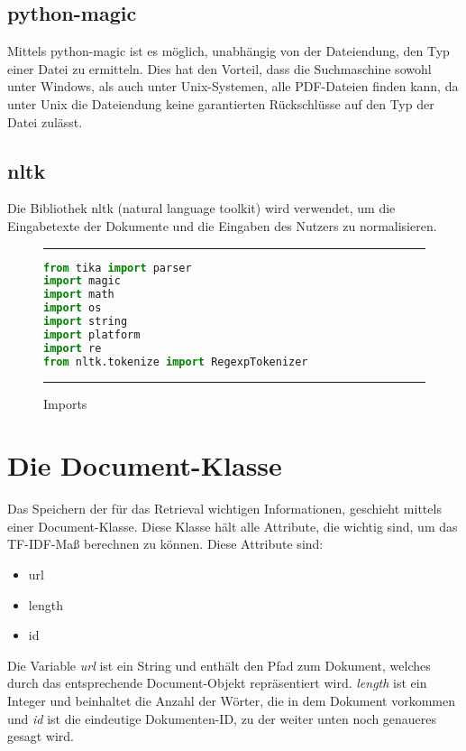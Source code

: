 \subsection{python-magic}\label{python-magic}

Mittels python-magic ist es möglich, unabhängig von der Dateiendung, den Typ einer Datei zu ermitteln. Dies hat den Vorteil, dass die Suchmaschine sowohl unter Windows, als auch unter Unix-Systemen, alle PDF-Dateien finden kann, da unter Unix die Dateiendung keine garantierten Rückschlüsse auf den Typ der Datei zulässt.

\subsection{nltk}\label{nltk}

Die Bibliothek nltk (natural language toolkit) wird verwendet, um die Eingabetexte der Dokumente und die Eingaben des Nutzers zu normalisieren. %

\begin{figure}[h]
	\rule{\textwidth}{0.4pt}
		\begin{lstlisting}[language=Python]
from tika import parser
import magic
import math
import os
import string
import platform
import re
from nltk.tokenize import RegexpTokenizer
		\end{lstlisting}
	\rule{\textwidth}{0.4pt}
	\caption{Imports}
	\label{fig:import}
\end{figure}

\section{Die Document-Klasse}\label{die-document-klasse}

Das Speichern der für das Retrieval wichtigen Informationen, geschieht mittels einer Document-Klasse. Diese Klasse hält alle Attribute, die wichtig sind, um das TF-IDF-Maß berechnen zu können. Diese Attribute sind:
\begin{itemize}
	\item url
	\item length 
	\item id
\end{itemize} 
Die Variable \emph{url} ist ein String und enthält den Pfad zum Dokument, welches durch das entsprechende Document-Objekt repräsentiert wird. \emph{length} ist ein Integer und beinhaltet die Anzahl der Wörter, die in dem Dokument vorkommen und \emph{id} ist die eindeutige Dokumenten-ID, zu der weiter unten noch genaueres gesagt wird.

